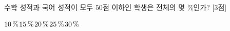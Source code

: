 수학 성적과 국어 성적이 모두 $50$점 이하인 학생은 전체의 몇 $\%$인가? \mbox{[3점]}
\begin{choices32}{$10\mkern3mu \%$}{$15\mkern3mu \%$}{$20\mkern3mu \%$}{$25\mkern3mu \%$}{$30\mkern3mu \%$}\end{choices32}
